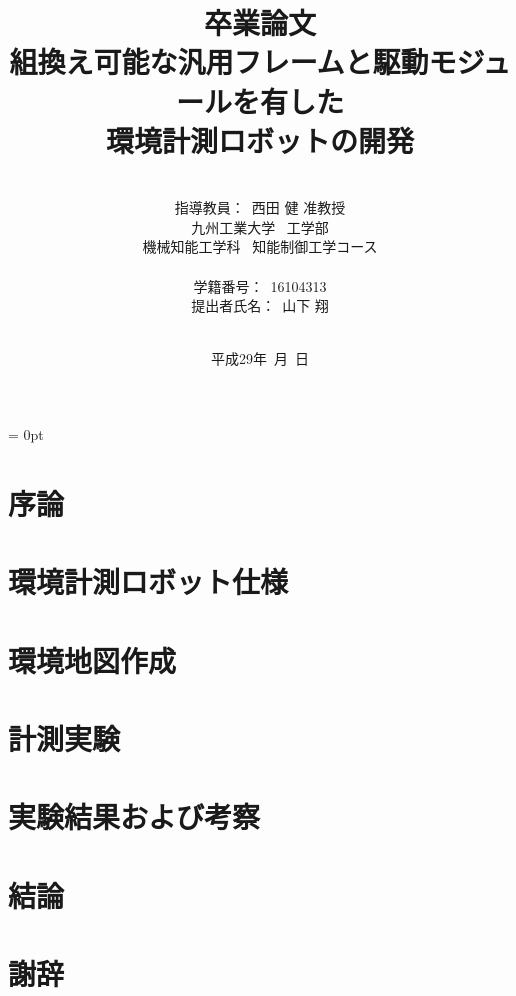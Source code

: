 \documentclass[a4paper,12pt]{ujarticle}
\title{卒業論文\\
組換え可能な汎用フレームと駆動モジュールを有した\\環境計測ロボットの開発\\
}
\author{\vspace{20mm}\\
指導教員：\ 西田 \hspace{0mm} 健 准教授\\
九州工業大学\ \hspace{0mm} 工学部\\
機械知能工学科\ \hspace{0mm} 知能制御工学コース \\
\vspace{0mm}\\
学籍番号：\ 16104313\\
提出者氏名：\ 山下 \hspace{0mm} 翔\\\vspace{5mm}\\ }
\date{平成29年\ 月\ 日}
\begin{document}
\titlepage
\maketitle
\thispagestyle{empty} \newpage
{}
\setcounter{page}{1}
\parindent = 0pt %

\begin{abstract}

\end{abstract}
\thispagestyle{empty}
\newpage
\thispagestyle{empty}
\tableofcontents
\newpage
\section{序論} \label{intro}

\newpage
\section{環境計測ロボット仕様} \label{spec}

\newpage
\section{環境地図作成} \label{mapping}

\newpage
\section{計測実験} \label{experiment}

\newpage
\section{実験結果および考察} \label{result}

\newpage
\section{結論} \label{conclusion}

\section*{謝辞} \label{thanks}
\end{document}
